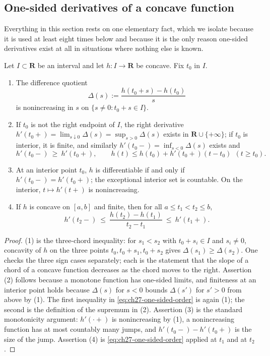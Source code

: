\subsection{One-sided derivatives of a concave function}
\label{sec:ch27-concave-calculus}

Everything in this section rests on one elementary fact, which we isolate
because it is used at least eight times below and because it is the only
reason one-sided derivatives exist at all in situations where nothing else
is known.

\begin{lemma}
\label{lem:ch27-concave-quotients}
Let $I\subset\mathbf R$ be an interval and let $h:I\to\mathbf R$ be
concave.  Fix $t_0$ in $I$.
\begin{enumerate}
\item The difference quotient
\[
 \Delta(s):=\frac{h(t_0+s)-h(t_0)}{s}
\]
is nonincreasing in $s$ on $\{s\neq0: t_0+s\in I\}$.
\item If $t_0$ is not the right endpoint of $I$, the right derivative
$h'(t_0+)=\lim_{s\downarrow0}\Delta(s)=\sup_{s>0}\Delta(s)$ exists in
$\mathbf R\cup\{+\infty\}$; if $t_0$ is interior, it is finite, and
similarly $h'(t_0-)=\inf_{s<0}\Delta(s)$ exists and
\begin{equation}\label{eq:ch27-one-sided-order}
 h'(t_0-)\ \geq\ h'(t_0+),
 \qquad
 h(t)\leq h(t_0)+h'(t_0+)(t-t_0)\ \ (t\geq t_0).
\end{equation}
\item At an interior point $t_0$, $h$ is differentiable if and only if
$h'(t_0-)=h'(t_0+)$; the exceptional interior set is countable.
On the interior, $t\mapsto h'(t+)$ is nonincreasing.
\item If $h$ is concave on $[a,b]$ and finite, then for all
$a\leq t_1<t_2\leq b$,
\begin{equation}\label{eq:ch27-endpoint-sandwich}
 h'(t_2-)\ \leq\ \frac{h(t_2)-h(t_1)}{t_2-t_1}\ \leq\ h'(t_1+).
\end{equation}
\end{enumerate}
\end{lemma}

\begin{proof}
(1) is the three-chord inequality: for $s_1<s_2$ with $t_0+s_i\in I$ and
$s_i\neq0$, concavity of $h$ on the three points
$t_0,t_0+s_1,t_0+s_2$ gives $\Delta(s_1)\geq\Delta(s_2)$.  One checks
the three sign cases separately; each is the statement that the slope of a
chord of a concave function decreases as the chord moves to the right.
Assertion (2) follows because a monotone function has one-sided limits, and
finiteness at an interior point holds because $\Delta(s)$ for $s<0$
bounds $\Delta(s')$ for $s'>0$ from above by (1).  The first inequality
in \eqref{eq:ch27-one-sided-order} is again (1); the second is the
definition of the supremum in (2).  Assertion (3) is the standard
monotonicity argument: $h'(\cdot+)$ is nonincreasing by (1), a
nonincreasing function has at most countably many jumps, and
$h'(t_0-)-h'(t_0+)$ is the size of the jump.  Assertion (4) is
\eqref{eq:ch27-one-sided-order} applied at $t_1$ and at $t_2$.
\end{proof}

